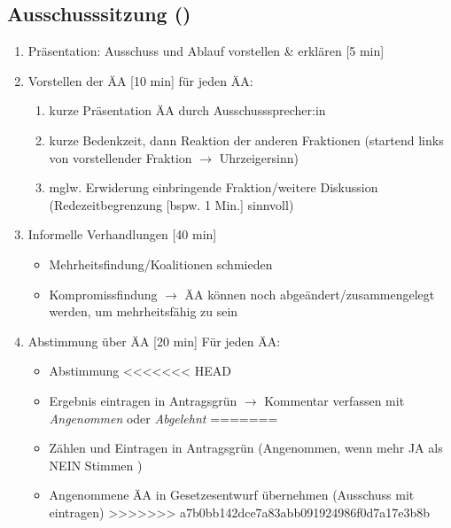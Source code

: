 \documentclass{article}
\begin{document}
	\subsection{Ausschusssitzung (\timeAuss)}
	\begin{enumerate}
		\item Präsentation: Ausschuss und Ablauf vorstellen \& erklären [5 min]
        \item Vorstellen der ÄA [10 min] \newline
        für jeden ÄA:
        \begin{enumerate}
            \item kurze Präsentation ÄA durch Ausschusssprecher:in
			\item kurze Bedenkzeit, dann Reaktion der anderen Fraktionen (startend links von vorstellender Fraktion $\to$ Uhrzeigersinn)
            \item mglw. Erwiderung einbringende Fraktion/weitere Diskussion \newline (Redezeitbegrenzung [bspw. 1 Min.] sinnvoll)
        \end{enumerate}
		\item Informelle Verhandlungen [40 min]
		\begin{itemize}
			\item Mehrheitsfindung/Koalitionen schmieden
			\item Kompromissfindung $\to$ ÄA können noch abgeändert/zusammengelegt werden, um mehrheitsfähig zu sein
		\end{itemize}
		\item Abstimmung über ÄA [20 min]\newline
		Für jeden ÄA:
		\begin{itemize}
			\item Abstimmung
<<<<<<< HEAD
			\item Ergebnis eintragen in Antragsgrün \newline
            $\to$ Kommentar verfassen mit \textit{Angenommen} oder \textit{Abgelehnt}
=======
			\item Zählen und Eintragen in Antragsgrün \newline
            (Angenommen, wenn mehr JA als NEIN Stimmen )
            \item Angenommene ÄA in Gesetzesentwurf übernehmen (Ausschuss mit eintragen)
>>>>>>> a7b0bb142dce7a83abb091924986f0d7a17e3b8b
		\end{itemize}
	\end{enumerate}
	
\end{document}
